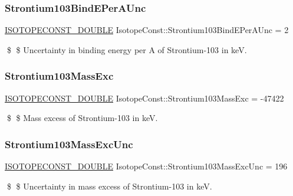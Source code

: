 \subsubsection{\texorpdfstring{Strontium103\+Bind\+E\+Per\+A\+Unc}{Strontium103BindEPerAUnc}}
{\footnotesize\ttfamily \mbox{\hyperlink{group___isotope_const-_macros_ga8f45a7272ce02c0b4c65c44636ed719a}{I\+S\+O\+T\+O\+P\+E\+C\+O\+N\+S\+T\+\_\+\+D\+O\+U\+B\+LE}} Isotope\+Const\+::\+Strontium103\+Bind\+E\+Per\+A\+Unc = 2}

\$ \$ Uncertainty in binding energy per A of Strontium-\/103 in keV. \mbox{\label{group___isotope_const-_strontium-_sr103_ga057f85aaf768f5d4ffd4f433ec3835a2}} 
\subsubsection{\texorpdfstring{Strontium103\+Mass\+Exc}{Strontium103MassExc}}
{\footnotesize\ttfamily \mbox{\hyperlink{group___isotope_const-_macros_ga8f45a7272ce02c0b4c65c44636ed719a}{I\+S\+O\+T\+O\+P\+E\+C\+O\+N\+S\+T\+\_\+\+D\+O\+U\+B\+LE}} Isotope\+Const\+::\+Strontium103\+Mass\+Exc = -\/47422}

\$ \$ Mass excess of Strontium-\/103 in keV. \mbox{\label{group___isotope_const-_strontium-_sr103_ga66cc548a748112cb04eb602e6e0809c5}} 
\subsubsection{\texorpdfstring{Strontium103\+Mass\+Exc\+Unc}{Strontium103MassExcUnc}}
{\footnotesize\ttfamily \mbox{\hyperlink{group___isotope_const-_macros_ga8f45a7272ce02c0b4c65c44636ed719a}{I\+S\+O\+T\+O\+P\+E\+C\+O\+N\+S\+T\+\_\+\+D\+O\+U\+B\+LE}} Isotope\+Const\+::\+Strontium103\+Mass\+Exc\+Unc = 196}

\$ \$ Uncertainty in mass excess of Strontium-\/103 in keV. \mbox{\label{group___isotope_const-_strontium-_sr103_ga177ac6217be5572ecfdc67414628f852}} 
